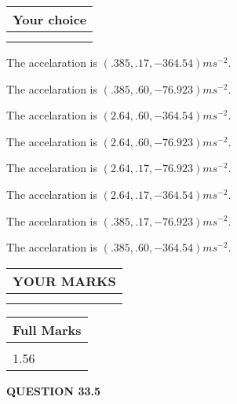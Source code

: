 \documentclass[12pt]{article}
\begin{document}
  
  
\noindent\hspace{3.0in} \begin{tabular}{|l|}
\hline
Your choice \\
\hline
 \\ 
 \\ 
\hline
\end{tabular}
  
  
 
 
The accelaration is $  %
(
.385,
.17,
-364.54)
ms^{-2} $.
 
 
The accelaration is $  %
(
.385,
.60,
-76.923)
ms^{-2} $.
 
 
The accelaration is $  %
(
2.64,
.60,
-364.54)
ms^{-2} $.
 
 
The accelaration is $  %
(
2.64,
.60,
-76.923)
ms^{-2} $.
 
 
The accelaration is $  %
(
2.64,
.17,
-76.923)
ms^{-2} $.
 
 
The accelaration is $  %
(
2.64,
.17,
-364.54)
ms^{-2} $.
 
 
The accelaration is $  %
(
.385,
.17,
-76.923)
ms^{-2} $.
 
 
The accelaration is $  %
(
.385,
.60,
-364.54)
ms^{-2} $.
 
 
 

 

 
\vspace{0.3in}
  
\vspace{0.2in}
  
\noindent\begin{tabular}{|l|}
\hline
 YOUR MARKS  \\
\hline
 \\ 
 \\ 
\hline
\end{tabular}
\hspace{0.05in} \begin{tabular}{|l|}
\hline
 Full Marks  \\
\hline
 \\ 
1.56 \\
\hline
\end{tabular}
{\textbf{\Large{QUESTION
33.5 
}}}
  
  
 
\end{document}
